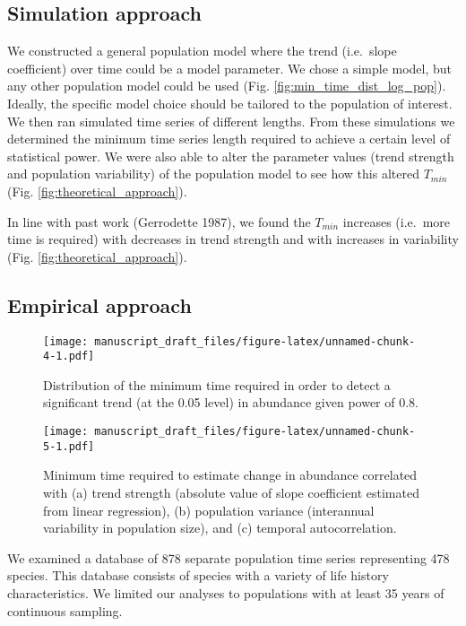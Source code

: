 \documentclass[12pt,]{article}
\begin{document}
\subsection{Simulation approach}\label{simulation-approach-1}

We constructed a general population model where the trend (i.e.~slope
coefficient) over time could be a model parameter. We chose a simple
model, but any other population model could be used (Fig.
\ref{fig:min_time_dist_log_pop}). Ideally, the specific model choice
should be tailored to the population of interest. We then ran simulated
time series of different lengths. From these simulations we determined
the minimum time series length required to achieve a certain level of
statistical power. We were also able to alter the parameter values
(trend strength and population variability) of the population model to
see how this altered \(T_{min}\) (Fig. \ref{fig:theoretical_approach}).

In line with past work (Gerrodette 1987), we found the \(T_{min}\)
increases (i.e.~more time is required) with decreases in trend strength
and with increases in variability (Fig. \ref{fig:theoretical_approach}).

\subsection{Empirical approach}\label{empirical-approach-1}

\begin{figure}[htbp]
\centering
\texttt{[image: manuscript\_draft\_files/figure-latex/unnamed-chunk-4-1.pdf]}
\caption{Distribution of the minimum time required in order to detect a
significant trend (at the 0.05 level) in abundance given power of
0.8.\label{fig:min_time_dist}}
\end{figure}

\begin{figure}[htbp]
\centering
\texttt{[image: manuscript\_draft\_files/figure-latex/unnamed-chunk-5-1.pdf]}
\caption{Minimum time required to estimate change in abundance
correlated with (a) trend strength (absolute value of slope coefficient
estimated from linear regression), (b) population variance (interannual
variability in population size), and (c) temporal
autocorrelation.\label{fig:correlates}}
\end{figure}

We examined a database of 878 separate population time series
representing 478 species. This database consists of species with a
variety of life history characteristics. We limited our analyses to
populations with at least 35 years of continuous sampling.
\end{document}
